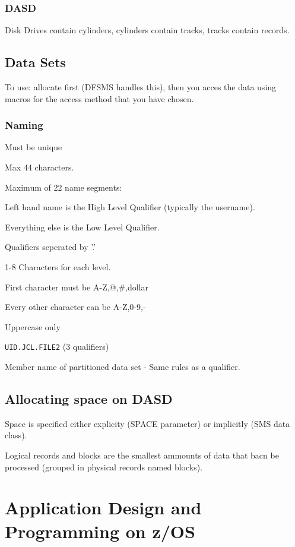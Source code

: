 \documentclass{report}
\begin{document}
\subsubsection{DASD}

Disk Drives contain cylinders, cylinders contain tracks, tracks contain records.

\subsection{Data Sets}

To use: allocate first (DFSMS handles this), then you acces the data using macros for the access method that you have chosen.

\subsubsection{Naming}

Must be unique

Max 44 characters.

Maximum of 22 name segments:

Left hand name is the High Level Qualifier (typically the username).

Everything else is the Low Level Qualifier.

Qualifiers seperated by '.'

1-8 Characters for each level.

First character must be A-Z,@,\#,dollar

Every other character can be A-Z,0-9,-

Uppercase only

\verb+UID.JCL.FILE2+ (3 qualifiers)

Member name of partitioned data set - Same rules as a qualifier.


\subsection{Allocating space on DASD}

Space is specified either explicity (SPACE parameter) or implicitly (SMS data class).

Logical records and blocks are the smallest ammounts of data that bacn be processed (grouped in physical records named blocks).


\section{Application Design and Programming on z/OS}
\end{document}
